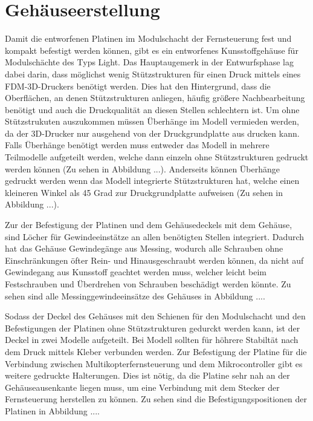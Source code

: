 \section{Gehäuseerstellung}
Damit die entworfenen Platinen im Modulschacht der Fernsteuerung fest und kompakt befestigt werden können, gibt es ein entworfenes Kunsstoffgehäuse für Modulschächte des Typs Light. Das Hauptaugemerk in der Entwurfsphase lag dabei darin, dass möglichst wenig Stützstrukturen für einen Druck mittels eines \ac{FDM}-3D-Druckers benötigt werden. Dies hat den Hintergrund, dass die Oberflächen, an denen Stützstrukturen anliegen, häufig größere Nachbearbeitung benötigt und auch die Druckqualität an diesen Stellen schlechtern ist. Um ohne Stützstrukuten auszukommen müssen Überhänge im Modell vermieden werden, da der 3D-Drucker nur ausgehend von der Druckgrundplatte aus drucken kann. Falls Überhänge benötigt werden muss entweder das Modell in mehrere Teilmodelle aufgeteilt werden, welche dann einzeln ohne Stützstrukturen gedruckt werden können (Zu sehen in Abbildung ...). Anderseits können Überhänge gedruckt werden wenn das Modell integrierte Stützstrukturen hat, welche einen kleineren Winkel als 45 Grad zur Druckgrundplatte aufweisen (Zu sehen in Abbildung ...).


Zur der Befestigung der Platinen und dem Gehäusedeckels mit dem Gehäuse, sind Löcher für Gewindeeinstätze an allen benötigten Stellen integriert. Dadurch hat das Gehäuse Gewindegänge aus Messing, wodurch alle Schrauben ohne Einschränkungen öfter Rein- und Hinausgeschraubt werden können, da nicht auf Gewindegang aus Kunsstoff geachtet werden muss, welcher leicht beim Festschrauben und Überdrehen von Schrauben beschädigt werden könnte. Zu sehen sind alle Messinggewindeeinsätze des Gehäuses in Abbildung ....


Sodass der Deckel des Gehäuses mit den Schienen für den Modulschacht und den Befestigungen der Platinen ohne Stützstrukturen gedurckt werden kann, ist der Deckel in zwei Modelle aufgeteilt. Bei Modell sollten für höhrere Stabiltät nach dem Druck mittels Kleber verbunden werden. Zur Befestigung der Platine für die Verbindung zwischen Multikopterfernsteuerung und dem Mikrocontroller gibt es weitere gedruckte Halterungen. Dies ist nötig, da die Platine sehr nah an der Gehäuseausenkante liegen muss, um eine Verbindung mit dem Stecker der Fernsteuerung herstellen zu können. Zu sehen sind die Befestigungspositionen der Platinen in Abbildung ....

